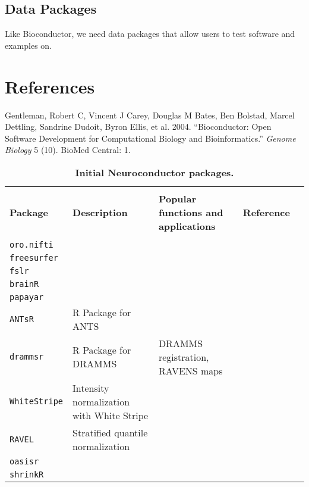 \documentclass[]{elsarticle} %
\begin{document}
\subsection{Data Packages}\label{data-packages}

Like Bioconductor, we need data packages that allow users to test
software and examples on.

\section*{References}\label{references}

\hypertarget{refs}{}
\hypertarget{ref-gentleman2004bioconductor}{}
Gentleman, Robert C, Vincent J Carey, Douglas M Bates, Ben Bolstad,
Marcel Dettling, Sandrine Dudoit, Byron Ellis, et al. 2004.
``Bioconductor: Open Software Development for Computational Biology and
Bioinformatics.'' \emph{Genome Biology} 5 (10). BioMed Central: 1.

\begin{table}[!ht]
\footnotesize
\centering
\caption{\textbf{Initial Neuroconductor packages.}}\label{tab:summary}
\begin{tabular}{lllcl}
\hline \\[-2ex]
\textbf{Package} & \textbf{Description} & \textbf{Popular functions and applications} & \textbf{Reference} \\
\hline \\ [-1.5ex]
\texttt{oro.nifti} &  &  & &   \\ [1ex]
\texttt{freesurfer} & &  & \\ [1ex]
 \texttt{fslr} &  & &   \\ [1ex]
 \texttt{brainR} &  &  &    \\ [1ex]
 \texttt{papayar} &  &  &    \\ [1ex]
   \texttt{ANTsR} & R Package for ANTS &   \\ [1ex]
  \texttt{drammsr} & R Package for DRAMMS & 
  DRAMMS registration, RAVENS maps  \\ [1ex]
 \texttt{WhiteStripe} & Intensity normalization with White Stripe & & &   \\ [1ex]
   \texttt{RAVEL} & Stratified quantile normalization &&&  \\ [1ex]
     \texttt{oasisr} &  &&&  \\ [1ex]
     \texttt{shrinkR} &  &&&  \\ [1ex]
\hline
\end{tabular}
\end{table}
\end{document}
